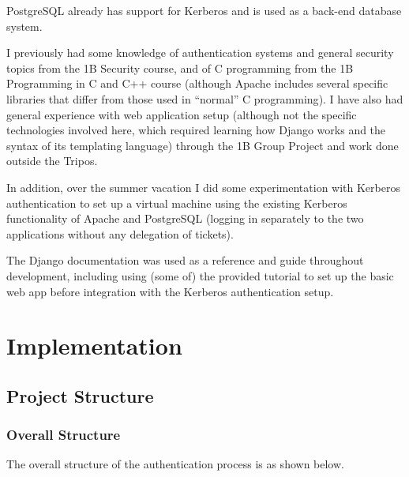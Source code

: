 \documentclass[12pt]{report}
\begin{document}
PostgreSQL already has support for Kerberos and is used as a back-end database system.

I previously had some knowledge of authentication systems and general security topics from the 1B Security course, and of C programming from the 1B Programming in C and C++ course (although Apache includes several specific libraries that differ from those used in ``normal'' C programming\cite{Apache-book}). I have also had general experience with web application setup (although not the specific technologies involved here, which required learning how Django works and the syntax of its templating language) through the 1B Group Project and work done outside the Tripos.

In addition, over the summer vacation I did some experimentation with Kerberos authentication to set up a virtual machine using the existing Kerberos functionality of Apache and PostgreSQL (logging in separately to the two applications without any delegation of tickets).

The Django documentation\cite{Django-docs} was used as a reference and guide throughout development, including using (some of) the provided tutorial to set up the basic web app before integration with the Kerberos authentication setup.


\chapter{Implementation}

\section{Project Structure}

\subsection{Overall Structure}
The overall structure of the authentication process is as shown below.
\end{document}
